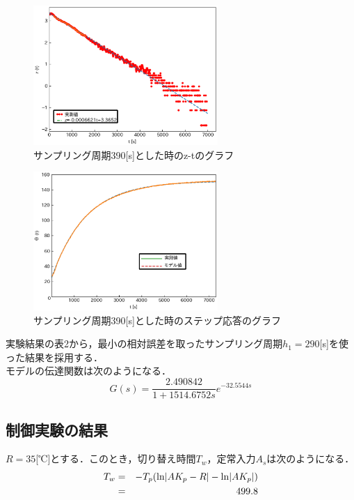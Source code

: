 \documentclass[12pt]{jsarticle}
\begin{document}
\begin{figure}[H]
  \begin{center}
    \includegraphics[clip,width=7.0cm]{../graph/z-t390s.eps}
    \caption{サンプリング周期390[s]とした時のz-tのグラフ}
    \label{z-t_h1=390s}
  \end{center}
\end{figure}
\begin{figure}[H]
  \begin{center}
    \includegraphics[clip,width=7.0cm]{../graph/step_response390s.eps}
    \caption{サンプリング周期390[s]とした時のステップ応答のグラフ}
    \label{step_response390s}
  \end{center}
\end{figure}
実験結果の表2から，最小の相対誤差を取ったサンプリング周期$h_1=290$[s]を使った結果を採用する．\\
モデルの伝達関数は次のようになる．
\begin{equation}
  \label{transform_result}
  G(s) = \frac{2.490842}{1+1514.6752s}e^{-32.5544s}
\end{equation}

\subsection{制御実験の結果}
$R=35$[℃]とする．このとき，切り替え時間$T_w$，定常入力$A_s$は次のようになる．
\begin{eqnarray}
  \label{T_w}
  T_w &=& -T_p ({\rm ln}|A K_p - R| - {\rm ln}| A K_p|) \\
      &=& 499.8
\end{eqnarray}
\end{document}
